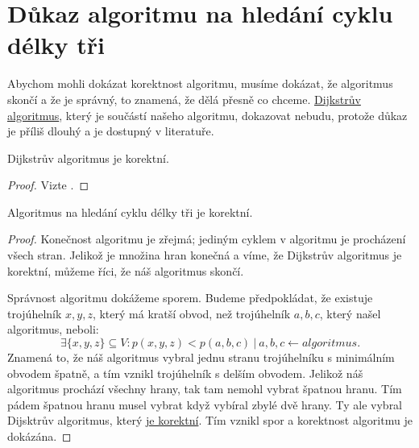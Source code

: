 \section{Důkaz algoritmu na hledání cyklu délky tři}
\label{dukaz_algoritmu}

Abychom mohli dokázat korektnost algoritmu, musíme dokázat, že algoritmus skončí a že je správný, to znamená, že dělá přesně co chceme. \hyperref[sec:dijkstra]{Dijkstrův algoritmus}, který je součástí našeho algoritmu, dokazovat nebudu, protože důkaz je příliš dlouhý a je dostupný v literatuře.
\begin{tvrzeni}
    \label{tvrzeni:dijkstra}
    Dijkstrův algoritmus je korektní.
\end{tvrzeni}
\begin{proof}
    \label{dukaz:dijkstra}
    Vizte \autocite[113]{benlFormalCorrectnessProofs1999}.
\end{proof}
\begin{tvrzeni}
    \label{tvrzeni:algoritmus}
    Algoritmus na hledání cyklu délky tři je korektní.
\end{tvrzeni}
\begin{proof}
    \label{dukaz:algoritmus}
Konečnost algoritmu je zřejmá; jediným cyklem v algoritmu je procházení všech stran. Jelikož je množina hran konečná a víme, že Dijkstrův algoritmus je korektní, můžeme říci, že náš algoritmus skončí.

Správnost algoritmu dokážeme sporem. Budeme předpokládat, že existuje trojúhelník $x, y, z$, který má kratší obvod, než trojúhelník $a, b, c$, který našel algoritmus, neboli:
\begin{equation*}
    \exists \{x, y, z\}\subseteq V: p(x, y, z) < p(a, b, c)~|~a, b, c \leftarrow algoritmus.
\end{equation*}
Znamená to, že náš algoritmus vybral jednu stranu trojúhelníku s minimálním obvodem špatně, a tím vznikl trojúhelník s delším obvodem. Jelikož náš algoritmus prochází všechny hrany, tak tam nemohl vybrat špatnou hranu. Tím pádem špatnou hranu musel vybrat když vybíral zbylé dvě hrany. Ty ale vybral Dijsktrův algoritmus, který \hyperref[dukaz:dijkstra]{je korektní}. Tím vznikl spor a korektnost algoritmu je dokázána. 
\end{proof}